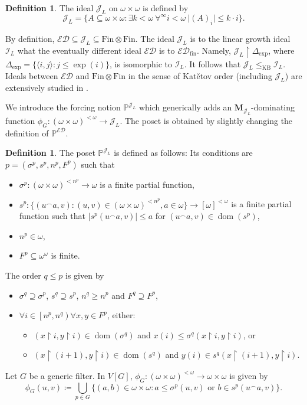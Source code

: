 \documentclass[a4paper,12pt]{amsart}
\theoremstyle{definition}
\newtheorem{dfn}[thm]{Definition}
\numberwithin{thm}{section}
\numberwithin{equation}{section}
\newcommand{\oo}{{\omega}^\omega}
\newcommand{\on}{\mathpunct{\upharpoonright}}
\DeclareMathOperator{\dom}{dom}
\newcommand{\ed}{\mathcal{ED}}
\newcommand{\I}{\mathscr{I}}
\newcommand{\J}{\mathscr{J}}
\newcommand{\edfin}{\mathcal{ED}_\mathrm{fin}}
\newcommand{\finfin}{\mathrm{Fin}\otimes\mathrm{Fin}}
\renewcommand{\subset}{\subseteq}
\newcommand{\posetED}{\mathbb{P}^{\ed}}
\newcommand{\posetJL}{\mathbb{P}^{\J_L}}
\begin{document}
    \begin{dfn}\label{dfn:JL}
        The ideal $\J_L$ on $\omega\times\omega$ is defined by
        \[
        \J_L = \{A\subset\omega\times\omega: \exists k<\omega~\forall^{\infty} i<\omega~\lvert (A)_i\rvert \leq k\cdot i\}.
        \]
    \end{dfn}
    
    By definition, $\ed\subset\J_L\subset\finfin$. The ideal $\J_L$ is to the linear growth ideal $\I_L$ what the eventually different ideal $\ed$ is to $\edfin$. Namely, $\J_L\upharpoonright\Delta_{\mathrm{exp}}$, where $\Delta_{\mathrm{exp}} = \{\langle i, j\rangle:j\leq \exp(i)\}$, is isomorphic to $\I_L$. It follows that $\J_L\leq_{\mathrm{KB}}\I_L$. Ideals between $\ed$ and $\finfin$ in the sense of Kat\v{e}tov order (including $\J_L$) are extensively studied in \cite{DFGT21}.
    
    We introduce the forcing notion $\posetJL$ which generically adds an $\mathbf{M}_{\J_L}$-dominating function $\phi_G\colon(\omega\times\omega)^{<\omega}\to\J_L$.
    The poset is obtained by slightly changing the definition of $\posetED$.
    
    \begin{dfn}
    	\label{dfn:posetfin}
    	The poset $\posetJL$ is defined as follows: Its conditions are $p=(\sigma^p,s^p,n^p,F^p)$ such that 
        \begin{itemize}
        	\item $\sigma^p\colon(\omega\times\omega)^{<n^p}\to\omega$ is a finite partial function,
        	\item $s^p\colon\{(u^\frown a,v):(u,v)\in(\omega\times\omega)^{<n^p},a\in\omega\}\to[\omega]^{<\omega}$ is a finite partial function such that $|s^p(u^\frown a,v)|\leq a$ for $(u^\frown a,v)\in\dom(s^p)$,
        	\item $n^p\in\omega$, 
        	\item $F^p\subseteq\oo$ is finite.   
        \end{itemize}
        The order $q\leq p$ is given by  
        \begin{itemize}
        	\item $\sigma^q\supseteq \sigma^p$, $s^q\supseteq s^p$, $n^q\geq n^p$ and $F^q\supseteq F^p$,  
        	\item $\forall i\in\left[n^p,n^q\right)\forall x,y\in F^p$, either:  
        	\begin{itemize}
        		\item $(x\on i, y\on i)\in\dom(\sigma^q)$ and $x(i)\leq\sigma^q(x\on i, y\on i)$, or  
        		\item $(x\on (i+1), y\on i)\in\dom(s^q)$ and $y(i)\in s^q(x\on (i+1), y\on i)$.
        	\end{itemize}
        \end{itemize}
        Let $G$ be a generic filter. In $V[G]$,  $\phi_G\colon(\omega\times\omega)^{<\omega}\to\omega\times\omega$ is given by
        \[
        \phi_G(u,v)\coloneqq\bigcup_{p\in G}\{(a,b)\in\omega\times\omega:a\leq\sigma^p(u,v)\text{ or }b\in s^p(u^\frown a,v)\}.
        \]
    \end{dfn}
    
\end{document}
